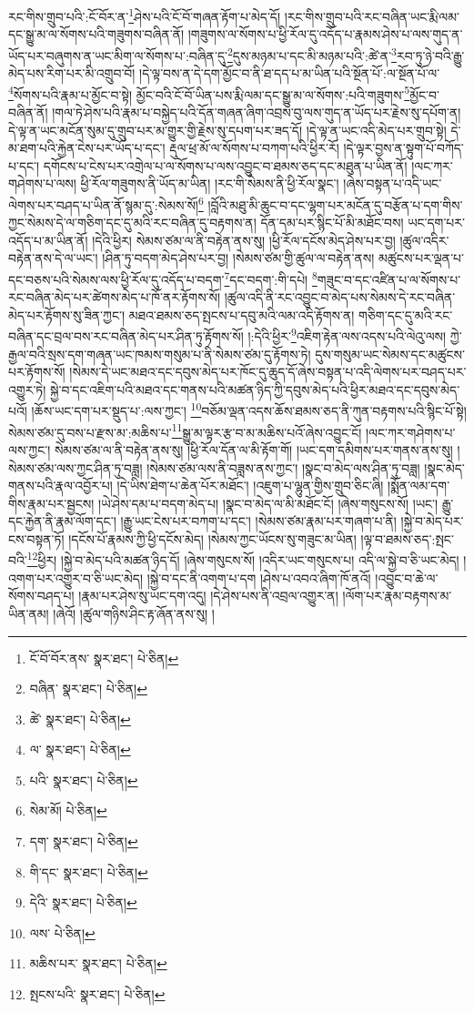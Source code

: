 རང་གིས་གྲུབ་པའི་:ངོ་བོར་ན་\footnote{ངོ་བོ་བོར་ནས་  སྣར་ཐང་།  པེ་ཅིན། }ཤེས་པའི་ངོ་བོ་གཞན་རྟོག་པ་མེད་དོ། །རང་གིས་གྲུབ་པའི་རང་བཞིན་ཡང་རྨི་ལམ་དང་སྒྱུ་མ་ལ་སོགས་པའི་གཟུགས་བཞིན་ནོ། །གཟུགས་ལ་སོགས་པ་ཕྱི་རོལ་དུ་འདོད་པ་རྣམས་ཤེས་པ་ལས་གུད་ན་ཡོད་པར་བཞུགས་ན་ཡང་མིག་ལ་སོགས་པ་:བཞིན་དུ་\footnote{བཞིན་  སྣར་ཐང་།  པེ་ཅིན། }དུས་མཉམ་པ་དང་མི་མཉམ་པའི་:ཚེ་ན་\footnote{ཚེ་  སྣར་ཐང་།  པེ་ཅིན། }རབ་ཏུ་ཉེ་བའི་རྒྱུ་མེད་པས་རིག་པར་མི་འགྲུབ་བོ། །དེ་ལྟ་བས་ན་དེ་དག་མྱོང་བ་ནི་ཐ་དད་པ་མ་ཡིན་པའི་སྔོན་པོ་:ལ་སྔོན་པོ་ལ་\footnote{ལ་  སྣར་ཐང་།  པེ་ཅིན། }སོགས་པའི་རྣམ་པ་མྱོང་བ་སྟེ། མྱོང་བའི་ངོ་བོ་ཡིན་པས་རྨི་ལམ་དང་སྒྱུ་མ་ལ་སོགས་:པའི་གཟུགས་\footnote{པའི་  སྣར་ཐང་།  པེ་ཅིན། }མྱོང་བ་བཞིན་ནོ། །གལ་ཏེ་ཤེས་པའི་རྣམ་པ་བསྐྱེད་པའི་དོན་གཞན་ཞིག་འབྲས་བུ་ལས་གུད་ན་ཡོད་པར་རྗེས་སུ་དཔོག་ན། དེ་ལྟ་ན་ཡང་མངོན་སུམ་དུ་གྲུབ་པར་མ་གྱུར་གྱི་རྗེས་སུ་དཔག་པར་ཟད་དོ། །དེ་ལྟ་ན་ཡང་འདི་མེད་པར་གྲུབ་སྟེ། དེ་མ་ཐག་པའི་རྐྱེན་ངེས་པར་ཡོད་པ་དང་། རྡུལ་ཕྲ་མོ་ལ་སོགས་པ་བཀག་པའི་ཕྱིར་རོ། །དེ་ལྟར་བྱས་ན་སྟུག་པོ་བཀོད་པ་དང་། དགོངས་པ་ངེས་པར་འགྲེལ་པ་ལ་སོགས་པ་ལས་འབྱུང་བ་ཐམས་ཅད་དང་མཐུན་པ་ཡིན་ནོ། །ལང་ཀར་གཤེགས་པ་ལས། ཕྱི་རོལ་གཟུགས་ནི་ཡོད་མ་ཡིན། །རང་གི་སེམས་ནི་ཕྱི་རོལ་སྣང་། །ཞེས་བསྟན་པ་འདི་ཡང་ལེགས་པར་བཤད་པ་ཡིན་ནོ་སྙམ་དུ་:སེམས་སོ།\footnote{སེམ་མོ།  པེ་ཅིན། } །བློའི་མཐུ་མི་ཆུང་བ་དང་ལྷག་པར་མངོན་དུ་བརྩོན་པ་དག་གིས་ཀྱང་སེམས་དེ་ལ་གཅིག་དང་དུ་མའི་རང་བཞིན་དུ་བརྟགས་ན། དོན་དམ་པར་སྙིང་པོ་མི་མཐོང་བས། ཡང་དག་པར་འདོད་པ་མ་ཡིན་ནོ། །དེའི་ཕྱིར། སེམས་ཙམ་ལ་ནི་བརྟེན་ནས་སུ། །ཕྱི་རོལ་དངོས་མེད་ཤེས་པར་བྱ། །ཚུལ་འདིར་བརྟེན་ནས་དེ་ལ་ཡང་། །ཤིན་ཏུ་བདག་མེད་ཤེས་པར་བྱ། །སེམས་ཙམ་གྱི་ཚུལ་ལ་བརྟེན་ནས། མཚུངས་པར་ལྡན་པ་དང་བཅས་པའི་སེམས་ལས་ཕྱི་རོལ་དུ་འདོད་པ་བདག་\footnote{དག་  སྣར་ཐང་།  པེ་ཅིན། }དང་བདག་:གི་དཔེ། \footnote{གི་དང་  སྣར་ཐང་།  པེ་ཅིན། }གཟུང་བ་དང་འཛིན་པ་ལ་སོགས་པ་རང་བཞིན་མེད་པར་ཚེགས་མེད་པ་ཁོ་ནར་རྟོགས་སོ། །ཚུལ་འདི་ནི་རང་འབྱུང་བ་མེད་པས་སེམས་དེ་རང་བཞིན་མེད་པར་རྟོགས་སུ་ཟིན་ཀྱང་། མཐའ་ཐམས་ཅད་སྤངས་པ་དབུ་མའི་ལམ་འདི་རྟོགས་ན། གཅིག་དང་དུ་མའི་རང་བཞིན་དང་བྲལ་བས་རང་བཞིན་མེད་པར་ཤིན་ཏུ་རྟོགས་སོ། །:དེའི་ཕྱིར་\footnote{དེའི་  སྣར་ཐང་།  པེ་ཅིན། }འཇིག་རྟེན་ལས་འདས་པའི་ལེའུ་ལས། ཀྱེ་རྒྱལ་བའི་སྲས་དག་གཞན་ཡང་ཁམས་གསུམ་པ་ནི་སེམས་ཙམ་དུ་རྟོགས་ཏེ། དུས་གསུམ་ཡང་སེམས་དང་མཚུངས་པར་རྟོགས་སོ། །སེམས་དེ་ཡང་མཐའ་དང་དབུས་མེད་པར་ཁོང་དུ་ཆུད་དོ་ཞེས་བསྟན་པ་འདི་ལེགས་པར་བཤད་པར་འགྱུར་ཏེ། སྐྱེ་བ་དང་འཇིག་པའི་མཐའ་དང་གནས་པའི་མཚན་ཉིད་ཀྱི་དབུས་མེད་པའི་ཕྱིར་མཐའ་དང་དབུས་མེད་པའོ། །ཆོས་ཡང་དག་པར་སྡུད་པ་:ལས་ཀྱང་། \footnote{ལས་  པེ་ཅིན། }བཅོམ་ལྡན་འདས་ཆོས་ཐམས་ཅད་ནི་ཀུན་བརྟགས་པའི་སྙིང་པོ་སྟེ། སེམས་ཙམ་དུ་བས་པ་རྫས་མ་:མཆིས་པ་\footnote{མཆིས་པར་  སྣར་ཐང་།  པེ་ཅིན། }སྒྱུ་མ་ལྟར་རྩ་བ་མ་མཆིས་པའོ་ཞེས་འབྱུང་ངོ། །ལང་ཀར་གཤེགས་པ་ལས་ཀྱང་། སེམས་ཙམ་ལ་ནི་བརྟེན་ནས་སུ། །ཕྱི་རོལ་དོན་ལ་མི་རྟོག་གོ། །ཡང་དག་དམིགས་པར་གནས་ནས་སུ། །སེམས་ཙམ་ལས་ཀྱང་ཤིན་ཏུ་བཟླ། །སེམས་ཙམ་ལས་ནི་བཟླས་ནས་ཀྱང་། །སྣང་བ་མེད་ལས་ཤིན་ཏུ་བཟླ། །སྣང་མེད་གནས་པའི་རྣལ་འབྱོར་པ། །དེ་ཡིས་ཐེག་པ་ཆེན་པོར་མཐོང་། །འཇུག་པ་ལྷུན་གྱིས་གྲུབ་ཅིང་ཞི། །སྨོན་ལམ་དག་གིས་རྣམ་པར་སྦྱངས། །ཡེ་ཤེས་དམ་པ་བདག་མེད་པ། །སྣང་བ་མེད་ལ་མི་མཐོང་ངོ། །ཞེས་གསུངས་སོ། །ཡང་། རྒྱུ་དང་རྐྱེན་ནི་རྣམ་ལོག་དང་། །རྒྱུ་ཡང་ངེས་པར་བཀག་པ་དང་། །སེམས་ཙམ་རྣམ་པར་གཞག་པ་ནི། །སྐྱེ་བ་མེད་པར་ངས་བསྟན་ཏོ། །དངོས་པོ་རྣམས་ཀྱི་ཕྱི་དངོས་མེད། །སེམས་ཀྱང་ཡོངས་སུ་གཟུང་མ་ཡིན། །ལྟ་བ་ཐམས་ཅད་:སྤང་བའི་\footnote{སྤངས་པའི་  སྣར་ཐང་།  པེ་ཅིན། }ཕྱིར། །སྐྱེ་བ་མེད་པའི་མཚན་ཉིད་དོ། །ཞེས་གསུངས་སོ། །འདིར་ཡང་གསུངས་པ། འདི་ལ་སྐྱེ་བ་ཅི་ཡང་མེད། །འགག་པར་འགྱུར་བ་ཅི་ཡང་མེད། །སྐྱེ་བ་དང་ནི་འགག་པ་དག །ཤེས་པ་འབའ་ཞིག་ཁོ་ནའོ། །འབྱུང་བ་ཆེ་ལ་སོགས་བཤད་པ། །རྣམ་པར་ཤེས་སུ་ཡང་དག་འདུ། །དེ་ཤེས་པས་ནི་འབྲལ་འགྱུར་ན། །ལོག་པར་རྣམ་བརྟགས་མ་ཡིན་ནམ། །ཞེའོ། །ཚུལ་གཉིས་ཤིང་རྟ་ཞོན་ནས་སུ། །
